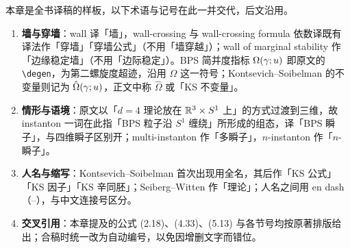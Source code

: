 \begin{yizhu}
本章是全书译稿的样板，以下术语与记号在此一并交代，后文沿用。
\begin{enumerate}[leftmargin=2em,itemsep=2pt,topsep=2pt]
\item \textbf{墙与穿墙}：wall 译「墙」，wall-crossing 与 wall-crossing formula 依数译既有译法作「穿墙」「穿墙公式」（不用「墙穿越」）；wall of marginal stability 作「边缘稳定墙」（不用「边际稳定」）。BPS 简并度指标 $\Omega(\gamma;u)$ 即原文的 \verb|\degen|，为第二螺旋度超迹，沿用 $\Omega$ 这一符号；Kontsevich--Soibelman 的不变量则记为 $\hat{\Omega}(\gamma;u)$，正文中称 $\hat\Omega$ 或「KS 不变量」。
\item \textbf{情形与语境}：原文以「$d=4$ 理论放在 $\mathbb{R}^3\times S^1$ 上」的方式过渡到三维，故 instanton 一词在此指「BPS 粒子沿 $S^1$ 缠绕」所形成的组态，译「BPS 瞬子」，与四维瞬子区别开；multi-instanton 作「多瞬子」，$n$-instanton 作「$n$-瞬子」。
\item \textbf{人名与缩写}：Kontsevich--Soibelman 首次出现用全名，其后作「KS 公式」「KS 因子」「KS 辛同胚」；Seiberg--Witten 作「\SW 理论」；人名之间用 en dash（--），与中文连接号区分。
\item \textbf{交叉引用}：本章提及的公式 (2.18)、(4.33)、(5.13) 与各节号均按原著排版给出；合稿时统一改为自动编号，以免因增删文字而错位。
\end{enumerate}
\end{yizhu}
